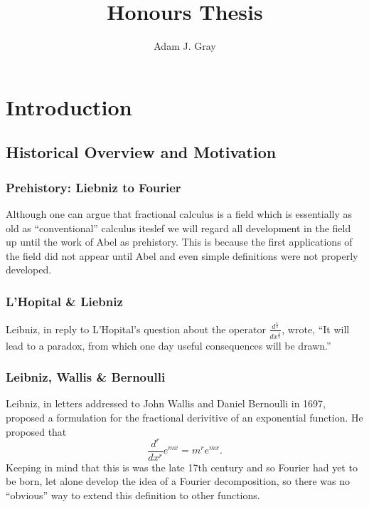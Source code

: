 \documentclass{unswmaths}
\author{Adam J. Gray}
\title{Honours Thesis}
\begin{document}
\unswtitle

\setlength\parindent{0pt}
\setlength{\parskip}{5mm plus4mm minus3mm}


\section*{Introduction}
\subsection*{Historical Overview and Motivation}
\subsubsection*{Prehistory: Liebniz to Fourier}
Although one can argue that fractional calculus is a field which is essentially as old as
``conventional'' calculus iteslef we will regard all development in the field up until the
work of Abel as prehistory. This is because the first applications of the field did not appear
until Abel and even simple definitions were not properly developed.

\subsubsection*{L'Hopital \& Liebniz}
Leibniz, in reply to L'Hopital's question about the operator $ \frac{d^\frac{1}{2}}{dx^\frac{1}{2}} $, 
wrote, ``It will lead to a paradox, from which one day useful consequences will be drawn.''
\subsubsection*{Leibniz, Wallis \& Bernoulli}
Leibniz, in letters addressed to John Wallis and Daniel Bernoulli in 1697, proposed a 
formulation for the fractional derivitive of an exponential function.
He proposed that 
$$
    \frac{d^r}{dx^r} e^{mx} = m^r e^{mx}.
$$
Keeping in mind that this is was the late 17th century and so Fourier had yet to 
be born, let alone develop the idea of a Fourier decomposition, so there was
no ``obvious'' way to extend this definition to other functions.
\end{document}
